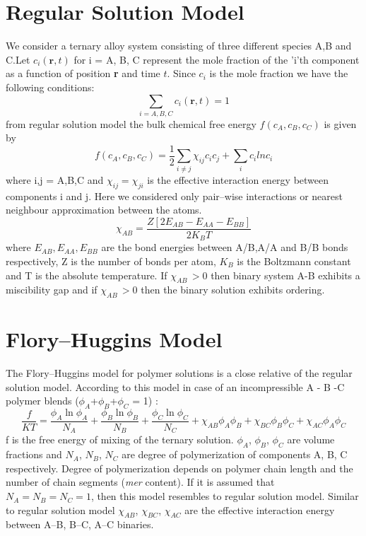 \documentclass[12pt]{iiscthes}
\theoremstyle{definition}
\theoremstyle{definition}
\theoremstyle{remark}
\begin{document}
\section{Regular Solution Model}
We consider a ternary alloy system consisting of three different species A,B and C.Let  $c_i\left(\mathbf{r},t\right)$  for i = A, B, C represent the mole fraction of the 'i'th component as a function of position \textbf{r} and time $t$. Since $c_i$ is the mole fraction we have the following conditions:
\begin{equation}\label{51}
\sum_{i=A,B,C}{c_i}\left(\mathbf{r},t\right) = 1
\end{equation}
from regular solution model the bulk chemical free energy $ f\left(c_A,c_B,c_C\right) $ is given by
\begin{equation}\label{52}
 f\left(c_A,c_B,c_C\right)=\frac{1}{2}\sum_{i\neq j}\chi_{ij}c_ic_j+\sum_ic_ilnc_i
 \end{equation}
where i,j = A,B,C and $\chi_{ij} = \chi_{ji}$ is the effective interaction energy between components i and j. Here we considered only pair--wise interactions or nearest neighbour approximation between the atoms.
\begin{equation}\label{ie}
\chi_{AB} = \dfrac{Z\left[2E_{AB}-E_{AA}-E_{BB}\right]}{2K_B T}
\end{equation}
where $E_{AB},E_{AA},E_{BB}$ are the bond energies between A/B,A/A and B/B bonds respectively, Z is the number of bonds per atom, $K_B$ is the Boltzmann constant and T is the absolute temperature. If $\chi_{AB}\,>0$ then binary system A-B exhibits a miscibility gap and if $\chi_{AB}\,>0$ then the binary solution exhibits ordering.

\section{Flory--Huggins Model}
The Flory--Huggins model for polymer solutions is a close relative of the regular solution model. According to this model in case of an incompressible A - B -C polymer blends ($\phi_A$+$\phi_B$+$\phi_C$ = 1) :
\begin{equation}
\frac{f}{KT} = \frac{\phi_A \ln \phi_A}{N_A} +\frac{\phi_B \ln \phi_B}{N_B}+\frac{\phi_C \ln \phi_C}{N_C} + \chi_{AB}\phi_A \phi_B +\chi_{BC}\phi_B \phi_C +\chi_{AC}\phi_A \phi_C
\end{equation}
f is the free energy of mixing of the ternary solution. $\phi_A$, $\phi_B$, $\phi_C$ are volume fractions and $N_A$, $N_B$, $N_C$ are degree of polymerization of components A, B, C respectively. Degree of polymerization depends on polymer chain length and the number of chain segments (\emph{mer} content). If it is assumed that $N_A = N_B = N_C = 1$, then this model resembles to regular solution model. Similar to regular solution model $\chi_{AB}$, $\chi_{BC}$, $\chi_{AC}$ are the effective interaction energy between A--B, B--C, A--C binaries. 
\end{document}
